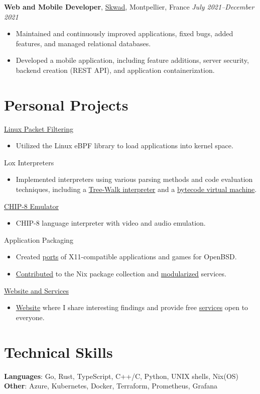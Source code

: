 \documentclass[margin,line]{../res}
\begin{document}
\begin{resume}
	{\bf Web and Mobile Developer}, \href{https://skwad.com/}{Skwad}, Montpellier, France
	\hfill {\it July 2021--December 2021}
	\vspace*{.05in}
	\begin{itemize}
		\item Maintained and continuously improved applications, fixed bugs, added features, and managed relational databases.
		\item Developed a mobile application, including feature additions, server security, backend creation (REST API), and application containerization.
	\end{itemize}

	\section{\sc Personal Projects}
	\href{https://github.com/theobori/tinyfilter}{Linux Packet Filtering}
	\begin{itemize}
		\item Utilized the Linux eBPF library to load applications into kernel space.
	\end{itemize}

	Lox Interpreters
	\begin{itemize}
		\item Implemented interpreters using various parsing methods and code evaluation techniques, including a \href{https://github.com/theobori/tinylox}{Tree-Walk interpreter} and a \href{https://github.com/theobori/lox-virtual-machine}{bytecode virtual machine}.
	\end{itemize}

	\href{https://github.com/theobori/tinychip}{CHIP-8 Emulator}
	\begin{itemize}
		\item CHIP-8 language interpreter with video and audio emulation.
	\end{itemize}

	Application Packaging
	\begin{itemize}
		\item Created \href{https://github.com/theobori/openbsd-ports}{ports} of X11-compatible applications and games for OpenBSD.
		\item \href{https://repology.org/maintainer/theo1.bori@epitech.eu}{Contributed} to the Nix package collection and \href{https://github.com/theobori/nix-teeworlds}{modularized} services.
	\end{itemize}

	\href{https://github.com/theobori-cafe}{Website and Services}
	\begin{itemize}
		\item \href{https://theobori.cafe}{Website} where I share interesting findings and provide free \href{https://services.theobori.cafe}{services} open to everyone.
	\end{itemize}

	\section{\sc Technical Skills}
	\textbf{Languages}: Go, Rust, TypeScript, C++/C, Python, UNIX shells, Nix(OS)\\
	\textbf{Other}: Azure, Kubernetes, Docker, Terraform, Prometheus, Grafana

\end{resume}
\end{document}

